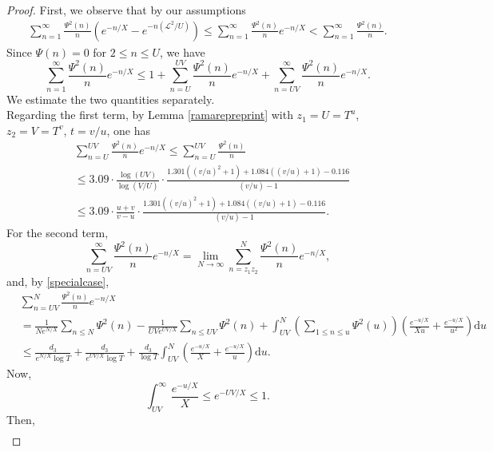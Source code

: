 \documentclass[reqno]{amsart}
\numberwithin{equation}{section}
\theoremstyle{remark}
\begin{document}
\begin{proof}
    First, we observe that by our assumptions
\begin{equation*}
    \begin{aligned}
         \sum_{n=1}^{\infty}\frac{\Psi^2(n)}{n}(e^{-n/X}-e^{-n(\mathscr{L}^2/U)})\le \sum_{n=1}^{\infty} \frac{\Psi^2(n)}{n}e^{-n / X}<\sum_{n=1}^{\infty} \frac{\Psi^2(n)}{n}.
    \end{aligned}
\end{equation*}
Since $\Psi(n)=0$ for $2\le n\le U$, we have
    \[
    \sum_{n=1}^{\infty}\frac{\Psi^2(n)}{n}e^{-n/X}\le 1+\sum_{n=U}^{UV}\frac{\Psi^2(n)}{n}e^{-n/X}+\sum_{n=UV}^{\infty}\frac{\Psi^2(n)}{n}e^{-n/X}.
    \]
    We estimate the two quantities separately.\\
    Regarding the first term, by Lemma \ref{ramarepreprint} with $z_1=U=T^u$, $z_2=V=T^v$, $t=v/u$, one has
    \begin{equation*}
        \begin{aligned}
         &\sum_{n=U}^{UV}\frac{\Psi^2(n)}{n}e^{-n/X}\le \sum_{n=U}^{UV}\frac{\Psi^2(n)}{n}\\&\le3.09\cdot \frac{\log(UV)}{\log(V/U)}\cdot \frac{1.301((v/u)^2+1)+1.084((v/u)+1)-0.116}{(v/u)-1}\\&\le 3.09\cdot \frac{u+v}{v-u}\cdot \frac{1.301((v/u)^2+1)+1.084((v/u)+1)-0.116}{(v/u)-1}.
        \end{aligned}
    \end{equation*}
For the second term,
    \[
    \sum_{n=UV}^{\infty}\frac{\Psi^2(n)}{n}e^{-n/X}=\lim_{N\rightarrow \infty}\sum_{n=z_1z_2}^{N}\frac{\Psi^2(n)}{n}e^{-n/X},
    \]
    and, by \eqref{specialcase},
\begin{equation*}
    \begin{aligned}
        &\sum_{n=UV}^{N}\frac{\Psi^2(n)}{n}e^{-n/X}\\&=\frac{1}{Ne^{N/X}}\sum_{n\le N}\Psi^2(n)-\frac{1}{UVe^{UV/X}}\sum_{n\le UV}\Psi^2(n)+\int_{UV}^N\left(\sum_{1\le n\le u}\Psi^2(u)\right)\left(\frac{e^{-u/X}}{Xu}+\frac{e^{-u/X}}{u^2}\right)\text{d}u\\&\le \frac{d_3}{e^{N/X}\log T}+\frac{d_3}{e^{UV/X}\log T}+\frac{d_3}{\log T}\int_{UV}^N\left(\frac{e^{-u/X}}{X}+\frac{e^{-u/X}}{u}\right)\text{d}u.
    \end{aligned}
\end{equation*}
    Now,
    \[
    \int_{UV}^\infty \frac{e^{-u/X}}{X}\le e^{-UV/X}\le 1.
    \]
    Then,
    \begin{equation*}
        \begin{aligned}

\end{aligned}
\end{equation*}
\end{proof}
\end{document}
